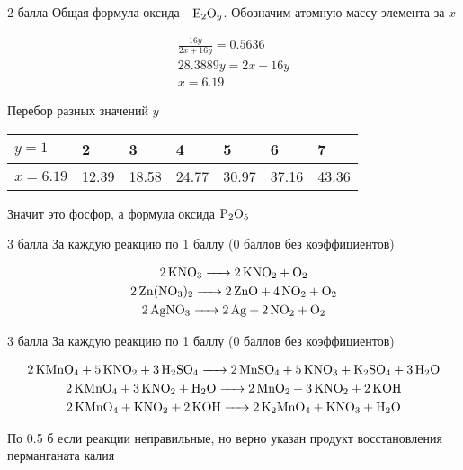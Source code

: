 

\begin{solbox}{2 балла}
  Общая формула оксида - $\ce{E2O_y}$. Обозначим атомную массу элемента за $x$

  \begin{gather*}
    \frac{16y}{2x + 16y} = 0.5636 \\
    28.3889 y = 2x + 16y \\
    x = 6.19
  \end{gather*}

  Перебор разных значений $y$
  \vspace{1ex}

  \begin{tabularx}{\textwidth}{|X|X|X|X|X|X|X|}
    \hline
    $y=1$ & 2 & 3 & 4 & 5 & 6 & 7 \\
    \hline
    $x=6.19$ & 12.39 & 18.58 & 24.77 & 30.97 & 37.16 & 43.36 \\
    \hline
  \end{tabularx}

  \vspace{1ex}
  Значит это фосфор, а формула оксида $\ce{P2O5}$
\end{solbox}


\begin{solbox}{3 балла}
  За каждую реакцию по 1 баллу (0 баллов без коэффициентов)

  \begin{gather*}
    \ce{2KNO3 -> 2KNO2 + O2} \\
    \ce{2Zn(NO3)2 -> 2ZnO + 4NO2 + O2} \\
    \ce{2AgNO3 -> 2Ag + 2NO2 + O2}
  \end{gather*}
\end{solbox}


\begin{solbox}{3 балла}
  За каждую реакцию по 1 баллу (0 баллов без коэффициентов)

  \begin{gather*}
  \ce{2KMnO4 + 5KNO2 + 3H2SO4 -> 2MnSO4 + 5KNO3 + K2SO4 + 3H2O} \\
  \ce{2KMnO4 + 3KNO2 + H2O -> 2MnO2 + 3KNO2 + 2KOH} \\
  \ce{2KMnO4 + KNO2 + 2KOH -> 2K2MnO4 + KNO3 + H2O}
  \end{gather*}

  По 0.5 б если реакции неправильные, но верно указан продукт восстановления перманганата калия
\end{solbox}


